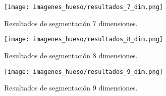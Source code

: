 \documentclass[conference]{IEEEtran}
\begin{document}
\begin{figure*}[!htb]
    \centering
    \texttt{[image: imagenes\_hueso/resultados\_7\_dim.png]}
    \caption{Resultados de segmentación 7 dimensiones.}
    \label{fig:resultados7dim}
\end{figure*}
\begin{figure*}[!htb]
    \centering
    \texttt{[image: imagenes\_hueso/resultados\_8\_dim.png]}
    \caption{Resultados de segmentación 8 dimensiones.}
    \label{fig:resultados8dim}
\end{figure*}
\begin{figure*}[!htb]
    \centering
    \texttt{[image: imagenes\_hueso/resultados\_9\_dim.png]}
    \caption{Resultados de segmentación 9 dimensiones.}
    \label{fig:resultados9dim}
\end{figure*}
\end{document}
